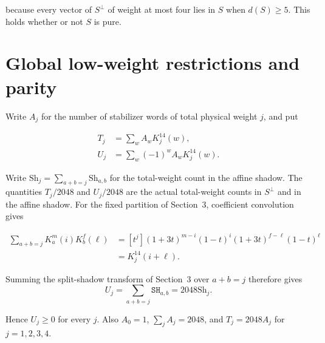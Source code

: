 \documentclass[11pt]{article}
\newcommand{\Sh}{\mathrm{Sh}}
\begin{document}
because every vector of \(S^\perp\) of weight at most four lies in \(S\) when \(d(S) \geq 5\). This holds whether or not \(S\) is pure.

\section{Global low-weight restrictions and parity}\label{global-low-weight-restrictions-and-parity}

Write \(A_{j}\) for the number of stabilizer words of total physical weight \(j\), and put

\[
\begin{aligned}
T_{j} &=\sum_{w} A_{w} K_{j}^{14}(w), \\
U_{j} &=\sum_{w} (-1)^{w} A_{w} K_{j}^{14}(w).
\end{aligned}
\]

Write \(\Sh_j=\sum_{a+b=j}\Sh_{a,b}\) for the total-weight count in the affine shadow. The quantities \(T_{j}/2048\) and \(U_{j}/2048\) are the actual total-weight counts in \(S^\perp\) and in the affine shadow. For the fixed partition of Section~3, coefficient convolution gives

\[
\begin{aligned}
\sum_{a+b=j}K_a^m(i)K_b^f(\ell)
&=[t^j](1+3t)^{m-i}(1-t)^i(1+3t)^{f-\ell}(1-t)^\ell\\
&=K_j^{14}(i+\ell).
\end{aligned}
\]

Summing the split-shadow transform of Section~3 over \(a+b=j\) therefore gives
\[
U_j=\sum_{a+b=j}\mathtt{SH}_{a,b}=2048\Sh_j.
\]

Hence \(U_{j} \geq 0\) for every \(j\). Also \(A_{0}=1\), \(\sum_{j} A_{j}=2048\), and \(T_{j}=2048 A_{j}\) for \(j=1,2,3,4\).
\end{document}
